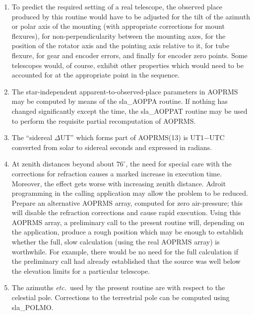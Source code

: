\documentclass[11pt,twoside]{article}
\begin{document}
{\begin{enumerate}
        equatorial located at the observer and with its polar axis
        aligned to the Earth's axis of rotation ({\it n.b.}\ not to the
        refracted pole).  Finally, the $\alpha$ is obtained by subtracting
        the {\it h}\/ from the local apparent ST.
  \item To predict the required setting of a real telescope, the
        observed place produced by this routine would have to be
        adjusted for the tilt of the azimuth or polar axis of the
        mounting (with appropriate corrections for mount flexures),
        for non-perpendicularity between the mounting axes, for the
        position of the rotator axis and the pointing axis relative
        to it, for tube flexure, for gear and encoder errors, and
        finally for encoder zero points.  Some telescopes would, of
        course, exhibit other properties which would need to be
        accounted for at the appropriate point in the sequence.
  \item The star-independent apparent-to-observed-place parameters
        in AOPRMS may be computed by means of the sla\_AOPPA routine.
        If nothing has changed significantly except the time, the
        sla\_AOPPAT routine may be used to perform the requisite
        partial recomputation of AOPRMS.
  \item The  ``sidereal $\Delta$UT'' which forms part of AOPRMS(13)
        is UT1$-$UTC converted from solar to
        sidereal seconds and expressed in radians.
  \item At zenith distances beyond about $76^\circ$, the need for
        special care with the corrections for refraction causes a
        marked increase in execution time.  Moreover, the effect
        gets worse with increasing zenith distance.  Adroit
        programming in the calling application may allow the
        problem to be reduced.  Prepare an alternative AOPRMS array,
        computed for zero air-pressure;  this will disable the
        refraction corrections and cause rapid execution.  Using
        this AOPRMS array, a preliminary call to the present routine
        will, depending on the application, produce a rough position
        which may be enough to establish whether the full, slow
        calculation (using the real AOPRMS array) is worthwhile.
        For example, there would be no need for the full calculation
        if the preliminary call had already established that the
        source was well below the elevation limits for a particular
        telescope.
  \item The azimuths {\it etc.}\ used by the present routine are with
        respect to the celestial pole.  Corrections to the terrestrial pole
        can be computed using sla\_POLMO.
 \end{enumerate}
}
\end{document}

